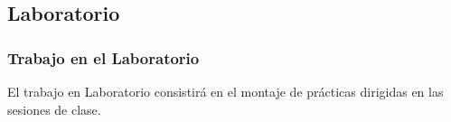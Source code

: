 \documentclass[14pt]{beamer}
\begin{document}
\subsection{Laboratorio}

\begin{frame}
\frametitle{Trabajo en el Laboratorio}
El trabajo en Laboratorio consistirá en el montaje de prácticas dirigidas en las sesiones de clase.
\end{frame}
\end{document}

